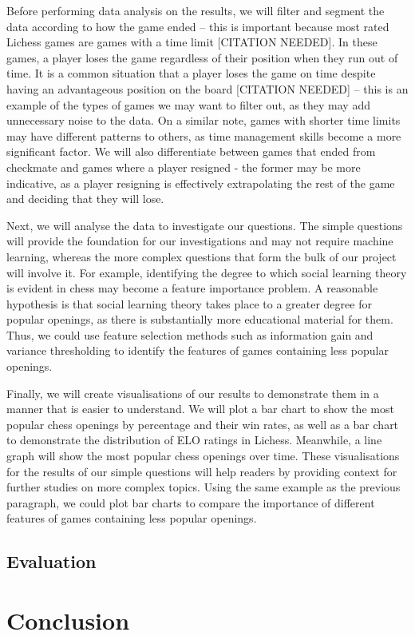 \documentclass[%
 superscriptaddress,
showpacs,preprintnumbers,
 amsmath,
 amssymb,
 aps,
 pra,
showkeys,
onecolumn,
notitlepage,
11pt,
tightenlines      %
]{revtex4-1}
\begin{document}
Before performing data analysis on the results, we will filter and segment the data according to how the game ended – this is important because most rated Lichess games are games with a time limit [CITATION NEEDED]. In these games, a player loses the game regardless of their position when they run out of time. It is a common situation that a player loses the game on time despite having an advantageous position on the board [CITATION NEEDED] – this is an example of the types of games we may want to filter out, as they may add unnecessary noise to the data. On a similar note, games with shorter time limits may have different patterns to others, as time management skills become a more significant factor. We will also differentiate between games that ended from checkmate and games where a player resigned - the former may be more indicative, as a player resigning is effectively extrapolating the rest of the game and deciding that they will lose.

Next, we will analyse the data to investigate our questions. The simple questions will provide the foundation for our investigations and may not require machine learning, whereas the more complex questions that form the bulk of our project will involve it. For example, identifying the degree to which social learning theory is evident in chess may become a feature importance problem. A reasonable hypothesis is that social learning theory takes place to a greater degree for popular openings, as there is substantially more educational material for them. Thus, we could use feature selection methods such as information gain and variance thresholding to identify the features of games containing less popular openings.

Finally, we will create visualisations of our results to demonstrate them in a manner that is easier to understand. We will plot a bar chart to show the most popular chess openings by percentage and their win rates, as well as a bar chart to demonstrate the distribution of ELO ratings in Lichess. Meanwhile, a line graph will show the most popular chess openings over time. These visualisations for the results of our simple questions will help readers by providing context for further studies on more complex topics. Using the same example as the previous paragraph, we could plot bar charts to compare the importance of different features of games containing less popular openings.

\subsection{Evaluation}

\section{Conclusion}



\end{document}
